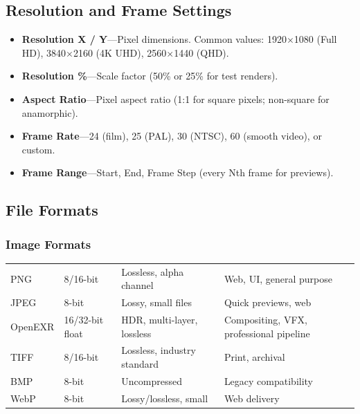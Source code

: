 \subsection{Resolution and Frame Settings}

\begin{itemize}[leftmargin=2em]
  \item \textbf{Resolution X / Y}---Pixel dimensions. Common values:
        1920$\times$1080 (Full HD), 3840$\times$2160 (4K UHD),
        2560$\times$1440 (QHD).
  \item \textbf{Resolution \%}---Scale factor (50\% or 25\% for
        test renders).
  \item \textbf{Aspect Ratio}---Pixel aspect ratio (1:1 for square
        pixels; non-square for anamorphic).
  \item \textbf{Frame Rate}---24 (film), 25 (PAL), 30 (NTSC),
        60 (smooth video), or custom.
  \item \textbf{Frame Range}---Start, End, Frame Step (every Nth
        frame for previews).
\end{itemize}

\subsection{File Formats}

\subsubsection{Image Formats}

\begin{center}
\begin{tabularx}{\textwidth}{L{1.8cm}C{1.8cm}L{3.5cm}X}
\toprule
{}
 &  &  &  \\
\midrule
PNG & 8/16-bit & Lossless, alpha channel & Web, UI, general purpose \\
JPEG & 8-bit & Lossy, small files & Quick previews, web \\
OpenEXR & 16/32-bit float & HDR, multi-layer, lossless & Compositing, VFX, professional pipeline \\
TIFF & 8/16-bit & Lossless, industry standard & Print, archival \\
BMP & 8-bit & Uncompressed & Legacy compatibility \\
WebP & 8-bit & Lossy/lossless, small & Web delivery \\
\bottomrule
\end{tabularx}
\end{center}

